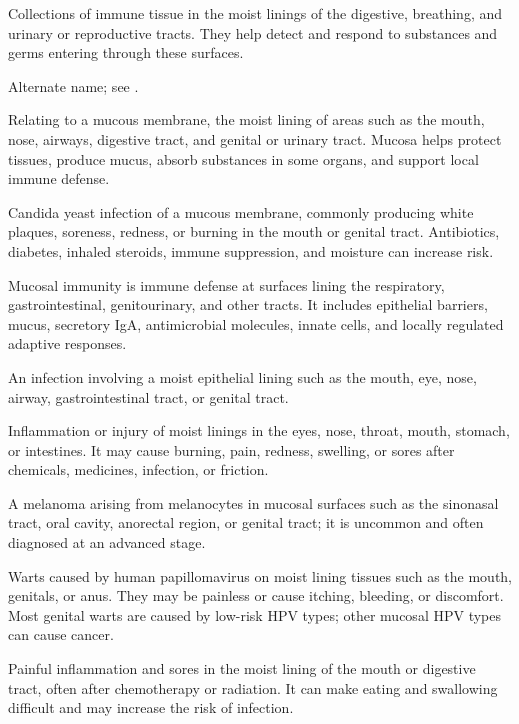  Collections of immune tissue in the moist linings of the digestive, breathing, and urinary or reproductive tracts. They help detect and respond to substances and germs entering through these surfaces.

 Alternate name; see .

 Relating to a mucous membrane, the moist lining of areas such as the mouth, nose, airways, digestive tract, and genital or urinary tract. Mucosa helps protect tissues, produce mucus, absorb substances in some organs, and support local immune defense.

 Candida yeast infection of a mucous membrane, commonly producing white plaques, soreness, redness, or burning in the mouth or genital tract. Antibiotics, diabetes, inhaled steroids, immune suppression, and moisture can increase risk.

 Mucosal immunity is immune defense at surfaces lining the respiratory, gastrointestinal, genitourinary, and other tracts. It includes epithelial barriers, mucus, secretory IgA, antimicrobial molecules, innate cells, and locally regulated adaptive responses.

 An infection involving a moist epithelial lining such as the mouth, eye, nose, airway, gastrointestinal tract, or genital tract.

 Inflammation or injury of moist linings in the eyes, nose, throat, mouth, stomach, or intestines. It may cause burning, pain, redness, swelling, or sores after chemicals, medicines, infection, or friction.

 A melanoma arising from melanocytes in mucosal surfaces such as the sinonasal tract, oral cavity, anorectal region, or genital tract; it is uncommon and often diagnosed at an advanced stage.

 Warts caused by human papillomavirus on moist lining tissues such as the mouth, genitals, or anus. They may be painless or cause itching, bleeding, or discomfort. Most genital warts are caused by low-risk HPV types; other mucosal HPV types can cause cancer.

 Painful inflammation and sores in the moist lining of the mouth or digestive tract, often after chemotherapy or radiation. It can make eating and swallowing difficult and may increase the risk of infection.


